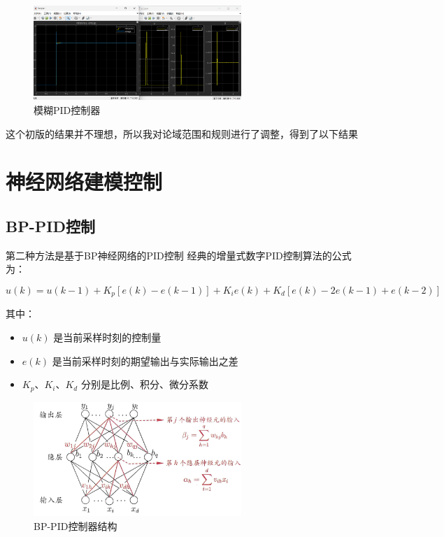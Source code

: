 \documentclass[12pt,a4paper,UTF8]{article}
\begin{document}
\begin{figure}[htbp] \centering \includegraphics[width=0.7\textwidth]{2024-12-30-12-27-30.png} \caption{模糊PID控制器}\end{figure}

这个初版的结果并不理想，所以我对论域范围和规则进行了调整，得到了以下结果


\clearpage
\section{神经网络建模控制}

\subsection{BP-PID控制}

第二种方法是基于BP神经网络的PID控制
经典的增量式数字PID控制算法的公式为：

\begin{equation}
u(k) = u(k-1) + K_p[e(k) - e(k-1)] + K_i e(k) + K_d[e(k) - 2e(k-1) + e(k-2)]
\end{equation}

其中：
\begin{itemize}
\item $u(k)$ 是当前采样时刻的控制量
\item $e(k)$ 是当前采样时刻的期望输出与实际输出之差
\item $K_p$、$K_i$、$K_d$ 分别是比例、积分、微分系数
\end{itemize}

\begin{figure}[htbp] \centering \includegraphics[width=0.7\textwidth]{2024-12-30-13-31-18.png} \caption{BP-PID控制器结构}\end{figure}
\end{document}
